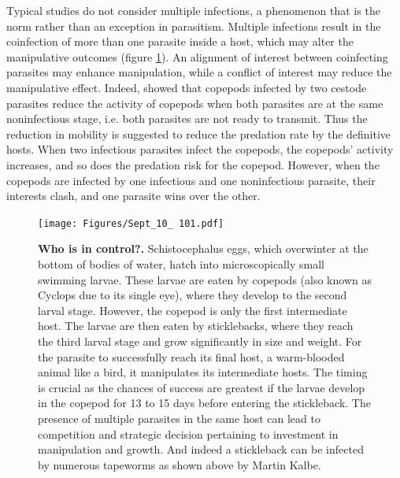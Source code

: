 \documentclass[11pt]{article}
\begin{document}
Typical studies do not consider multiple infections, a phenomenon that is the norm rather than an exception in parasitism. 
Multiple infections result in the coinfection of more than one parasite inside a host, which may alter the manipulative outcomes (figure \ref{fig:empirical}). 
An alignment of interest between coinfecting parasites may enhance manipulation, while a conflict of interest may reduce the manipulative effect. 
Indeed, \cite{Hafer:2015gl} showed that copepods infected by two cestode parasites reduce the activity of copepods when both parasites are at the same noninfectious stage, i.e. both parasites are not ready to transmit. 
Thus the reduction in mobility is suggested to reduce the predation rate by the definitive hosts. 
When two infectious parasites infect the copepods, the copepods' activity increases, and so does the predation risk for the copepod. 
However, when the copepods are infected by one infectious and one noninfectious parasite, their interests clash, and one parasite wins over the other. 

\begin{figure}[ht!]
\centering
\texttt{[image: Figures/Sept\_10\_ 101.pdf]}
\caption{\textbf{Who is in control?.}
Schistocephalus eggs, which overwinter at the bottom of bodies of water, hatch into microscopically small swimming larvae. 
These larvae are eaten by copepods (also known as Cyclops due to its single eye), where they develop to the second larval stage. 
However, the copepod is only the first intermediate host. 
The larvae are then eaten by sticklebacks, where they reach the third larval stage and grow significantly in size and weight. 
For the parasite to successfully reach its final host, a warm-blooded animal like a bird, it manipulates its intermediate hosts. 
The timing is crucial as the chances of success are greatest if the larvae develop in the copepod for 13 to 15 days before entering the stickleback. 
The presence of multiple parasites in the same host can lead to competition and strategic decision pertaining to investment in manipulation and growth.
And indeed a stickleback can be infected by numerous tapeworms as shown above by Martin Kalbe.
}
\label{fig:empirical}
\end{figure}
\end{document}
